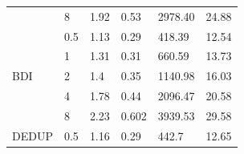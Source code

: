 \begin{table}[]
{\begin{tabular}{llllll}
    \multicolumn{1}{l|}{}                          & \multicolumn{1}{l|}{8}   & 1.92                                                                          & 0.53                                                                                & 2978.40                                                                        & 24.88                      \\ \cline{1-2}
    \multicolumn{1}{l|}{\multirow{5}{*}{BDI}}      & \multicolumn{1}{l|}{0.5} & 1.13                                                                          & 0.29                                                                              & 418.39                                                                         & 12.54                      \\
    \multicolumn{1}{l|}{}                          & \multicolumn{1}{l|}{1}   & 1.31                                                                          & 0.31                                                                               & 660.59                                                                         & 13.73                      \\
    \multicolumn{1}{l|}{}                          & \multicolumn{1}{l|}{2}   & 1.4                                                                          & 0.35                                                                               & 1140.98                                                                        & 16.03                      \\
    \multicolumn{1}{l|}{}                          & \multicolumn{1}{l|}{4}   & 1.78                                                                          & 0.44                                                                               & 2096.47                                                                        & 20.58                      \\
    \multicolumn{1}{l|}{}                          & \multicolumn{1}{l|}{8}   & 2.23                                                                          & 0.602                                                                               & 3939.53                                                                         & 29.58                      \\ \cline{1-2}
    \multicolumn{1}{l|}{\multirow{5}{*}{DEDUP}}    & \multicolumn{1}{l|}{0.5} & 1.16                                                                          & 0.29                                                                              & 442.7                                                                         & 12.65                      \\

\end{tabular}}
\end{table}
